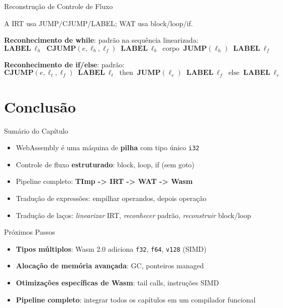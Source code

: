\begin{frame}{Reconstrução de Controle de Fluxo}

    A IRT usa JUMP/CJUMP/LABEL; WAT usa block/loop/if.

    \textbf{Reconhecimento de while}: padrão na sequência linearizada:
    \[\mathbf{LABEL}\ \ell_h \;\; \mathbf{CJUMP}(e, \ell_b, \ell_f) \;\; \mathbf{LABEL}\ \ell_b \;\; \text{corpo} \;\; \mathbf{JUMP}(\ell_h) \;\; \mathbf{LABEL}\ \ell_f\]

    \textbf{Reconhecimento de if/else}: padrão:
    \[\mathbf{CJUMP}(e, \ell_t, \ell_f) \;\; \mathbf{LABEL}\ \ell_t \;\; \text{then} \;\; \mathbf{JUMP}(\ell_e) \;\; \mathbf{LABEL}\ \ell_f \;\; \text{else} \;\; \mathbf{LABEL}\ \ell_e\]
\end{frame}


\section{Conclusão}\label{conclusuxe3o}

\begin{frame}[fragile]{Sumário do Capítulo}

    \begin{itemize}

        \item
        WebAssembly é uma máquina de \textbf{pilha} com tipo único
        \texttt{i32}
        \item
        Controle de fluxo \textbf{estruturado}: block, loop, if (sem goto)
        \item
        Pipeline completo: \textbf{TImp -> IRT -> WAT -> Wasm}
        \item
        Tradução de expressões: empilhar operandos, depois operação
        \item
        Tradução de laços: \emph{linearizar} IRT, \emph{reconhecer} padrão,
        \emph{reconstruir} block/loop
    \end{itemize}
\end{frame}

\begin{frame}[fragile]{Próximos Passos}

    \begin{itemize}

        \item
        \textbf{Tipos múltiplos}: Wasm 2.0 adiciona
        \texttt{f32}, \texttt{f64},
        \texttt{v128} (SIMD)
        \item
        \textbf{Alocação de memória avançada}: GC, ponteiros managed
        \item
        \textbf{Otimizações específicas de Wasm}: tail calls, instruções SIMD
        \item
        \textbf{Pipeline completo}: integrar todos os capítulos em um
        compilador funcional
    \end{itemize}
\end{frame}

